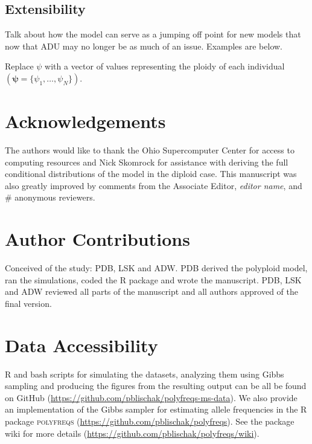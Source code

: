 \documentclass[11pt,english,letterpaper,oneside]{article}
\begin{document}
\medskip
\subsection*{Extensibility}
\medskip

Talk about how the model can serve as a jumping off point for new models that now that ADU may no longer be as much of an issue. Examples are below.
\medskip

Replace $\psi$ with a vector of values representing the ploidy of each individual $(\bm{\psi} = \{\psi_1,\ldots,\psi_N\})$.
\medskip



\section*{Acknowledgements}           %

The authors would like to thank the Ohio Supercomputer Center for access to computing resources and Nick Skomrock for assistance with deriving the full conditional distributions of the model in the diploid case. This manuscript was also greatly improved by comments from the Associate Editor, \textit{editor name}, and \# anonymous reviewers.
\medskip

\section*{Author Contributions}        %

Conceived of the study: PDB, LSK and ADW. PDB derived the polyploid model, ran the simulations, coded the R package and wrote the manuscript. PDB, LSK and ADW reviewed all parts of the manuscript and all authors approved of the final version.
\medskip

\section*{Data Accessibility}            %

R and bash scripts for simulating the datasets, analyzing them using Gibbs sampling and producing the figures from the resulting output can be all be found on GitHub (\url{https://github.com/pblischak/polyfreqs-ms-data}). We also provide an implementation of the Gibbs sampler for estimating allele frequencies in the R package \textsc{polyfreqs} (\url{https://github.com/pblischak/polyfreqs}). See the package wiki for more details (\url{https://github.com/pblischak/polyfreqs/wiki}).
\vspace{0.5in}
\end{document}

